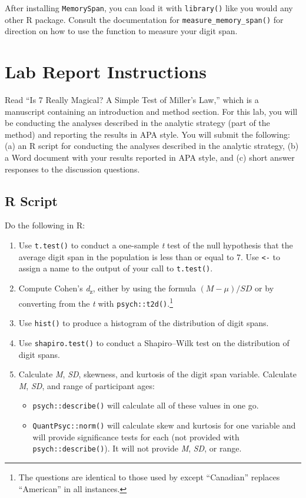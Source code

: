 \documentclass[
]{book}
\providecommand{\tightlist}{%
  \setlength{\itemsep}{0pt}\setlength{\parskip}{0pt}}
\begin{document}
After installing \texttt{MemorySpan}, you can load it with \texttt{library()} like you would any other R package. Consult the documentation for \texttt{measure\_memory\_span()} for direction on how to use the function to measure your digit span.

\hypertarget{ost-assignment}{%
\section{Lab Report Instructions}\label{ost-assignment}}

Read ``Is 7 Really Magical? A Simple Test of Miller's Law,'' which is a manuscript containing an introduction and method section. For this lab, you will be conducting the analyses described in the analytic strategy (part of the method) and reporting the results in APA style. You will submit the following: (a) an R script for conducting the analyses described in the analytic strategy, (b) a Word document with your results reported in APA style, and (c) short answer responses to the discussion questions.

\hypertarget{r-script}{%
\subsection{R Script}\label{r-script}}

Do the following in R:

\begin{enumerate}
\def\labelenumi{\arabic{enumi}.}
\tightlist
\item
  Use \texttt{t.test()} to conduct a one-sample \emph{t} test of the null hypothesis that the average digit span in the population is less than or equal to 7. Use \texttt{\textless{}-} to assign a name to the output of your call to \texttt{t.test()}.
\item
  Compute Cohen's \emph{d}\textsubscript{z}, either by using the formula \((M - \mu)/SD\) or by converting from the \emph{t} with \texttt{psych::t2d()}.\footnote{The questions are identical to those used by \citet{davies2008} except ``Canadian'' replaces ``American'' in all instances.}
\item
  Use \texttt{hist()} to produce a histogram of the distribution of digit spans.
\item
  Use \texttt{shapiro.test()} to conduct a Shapiro--Wilk test on the distribution of digit spans.
\item
  Calculate \emph{M}, \emph{SD}, skewness, and kurtosis of the digit span variable. Calculate \emph{M}, \emph{SD}, and range of participant ages:

  \begin{itemize}
  \tightlist
  \item
    \texttt{psych::describe()} will calculate all of these values in one go.
  \item
    \texttt{QuantPsyc::norm()} will calculate skew and kurtosis for one variable and will provide significance tests for each (not provided with \texttt{psych::describe()}). It will not provide \emph{M}, \emph{SD}, or range.
  \end{itemize}
\end{enumerate}
\end{document}
